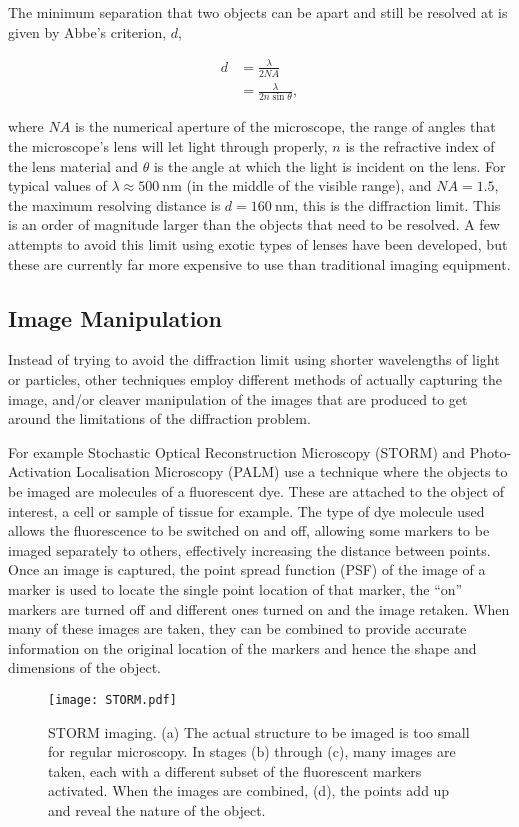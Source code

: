 The minimum separation that two objects can be apart and still be resolved at
is given by Abbe's criterion, $d$,

\begin{align}
	d &= \frac{\lambda}{2N\!A} \\
	  &= \frac{\lambda}{2n\sin\theta},
\end{align}

where $N\!A$ is the numerical aperture of the microscope, the range of angles
that the microscope's lens will let light through properly, $n$ is the
refractive index of the lens material and $\theta$ is the angle at which the
light is incident on the lens. For typical values of $\lambda \approx
\SI{500}{\nano\metre}$ (in the middle of the visible range), and $N\!A = 1.5$,
the maximum resolving distance is $d = \SI{160}{\nano\meter}$, this is the
diffraction limit. This is an order of magnitude larger than the objects that
need to be resolved. A few attempts to avoid this limit using exotic types of
lenses have been developed\cite{fang2005sub}, but these are currently far more
expensive to use than traditional imaging equipment.

\subsection{Image Manipulation}
\label{sub:image_manipulation}

Instead of trying to avoid the diffraction limit using shorter wavelengths of
light or particles, other techniques employ different methods of actually
capturing the image, and/or cleaver manipulation of the images that are
produced to get around the limitations of the diffraction problem.

For example Stochastic Optical Reconstruction Microscopy (STORM)
\cite{rust2006sub} and Photo-Activation Localisation Microscopy
(PALM)\cite{owen2010palm} use a technique where the objects to be imaged are
molecules of a fluorescent dye. These are attached to the object of interest, a
cell or sample of tissue for example. The type of dye molecule used allows the
fluorescence to be switched on and off, allowing some markers to be imaged
separately to others, effectively increasing the distance between points. Once
an image is captured, the point spread function (PSF) of the image of a marker
is used to locate the single point location of that marker, the ``on'' markers
are turned off and different ones turned on and the image retaken.  When many
of these images are taken, they can be combined to provide accurate information
on the original location of the markers and hence the shape and dimensions of
the object.

\begin{figure}[tbhp]
	\centering
	\texttt{[image: STORM.pdf]}

	\caption[Creation of a STORM image.]{STORM imaging. (a) The actual
		structure to be imaged is too small for regular microscopy. In stages
		(b) through (c), many images are taken, each with a different subset of
		the fluorescent markers activated. When the images are combined, (d),
		the points add up and reveal the nature of the object.}\label{fig:STORM}
\end{figure}
